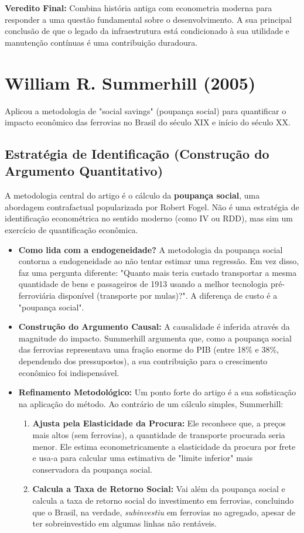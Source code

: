 \documentclass[12pt, a4paper]{article}
\begin{document}
\noindent\textbf{Veredito Final:} Combina história antiga com econometria moderna para responder a uma questão fundamental sobre o desenvolvimento. A sua principal conclusão de que o legado da infraestrutura está condicionado à sua utilidade e manutenção contínuas é uma contribuição duradoura. 

\section{William R. Summerhill (2005)}
Aplicou a metodologia de "social savings" (poupança social) para quantificar o impacto econômico das ferrovias no Brasil do século XIX e início do século XX. 

\subsection{Estratégia de Identificação (Construção do Argumento Quantitativo)}
A metodologia central do artigo é o cálculo da \textbf{poupança social}, uma abordagem contrafactual popularizada por Robert Fogel. Não é uma estratégia de identificação econométrica no sentido moderno (como IV ou RDD), mas sim um exercício de quantificação econômica.

\begin{itemize}
    \item \textbf{Como lida com a endogeneidade?} A metodologia da poupança social contorna a endogeneidade ao não tentar estimar uma regressão. Em vez disso, faz uma pergunta diferente: "Quanto mais teria custado transportar a mesma quantidade de bens e passageiros de 1913 usando a melhor tecnologia pré-ferroviária disponível (transporte por mulas)?". A diferença de custo é a "poupança social".

    \item \textbf{Construção do Argumento Causal:} A causalidade é inferida através da magnitude do impacto. Summerhill argumenta que, como a poupança social das ferrovias representava uma fração enorme do PIB (entre 18\% e 38\%, dependendo dos pressupostos), a sua contribuição para o crescimento econômico foi indispensável.

    \item \textbf{Refinamento Metodológico:} Um ponto forte do artigo é a sua sofisticação na aplicação do método. Ao contrário de um cálculo simples, Summerhill:
        \begin{enumerate}
            \item \textbf{Ajusta pela Elasticidade da Procura:} Ele reconhece que, a preços mais altos (sem ferrovias), a quantidade de transporte procurada seria menor. Ele estima econometricamente a elasticidade da procura por frete e usa-a para calcular uma estimativa de "limite inferior" mais conservadora da poupança social.
            \item \textbf{Calcula a Taxa de Retorno Social:} Vai além da poupança social e calcula a taxa de retorno social do investimento em ferrovias, concluindo que o Brasil, na verdade, \textit{subinvestiu} em ferrovias no agregado, apesar de ter sobreinvestido em algumas linhas não rentáveis.
        \end{enumerate}
\end{itemize}
\end{document}
